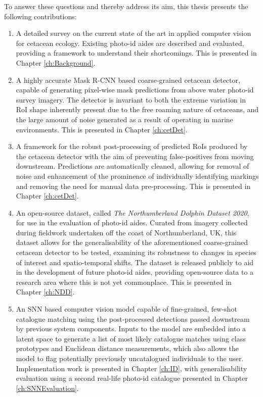 \noindent To answer these questions and thereby address its aim, this thesis presents the following contributions:

\begin{enumerate}
	\item A detailed survey on the current state of the art in applied computer vision for cetacean ecology. Existing photo-id aides are described and evaluated, providing a framework to understand their shortcomings. This is presented in Chapter \ref{ch:Background}. 
	\item A highly accurate Mask R-CNN \cite{he_mask_2017} based coarse-grained cetacean detector, capable of generating pixel-wise mask predictions from above water photo-id survey imagery. The detector is invariant to both the extreme variation in RoI shape inherently present due to the free roaming nature of cetaceans, and the large amount of noise generated as a result of operating in marine environments.  This is presented in Chapter \ref{ch:cetDet}.
	\item A framework for the robust post-processing of predicted RoIs produced by the cetacean detector with the aim of preventing false-positives from moving downstream. Predictions are automatically cleaned, allowing for removal of noise and enhancement of the prominence of individually identifying markings and removing the need for manual data pre-processing. This is presented in Chapter \ref{ch:cetDet}.
	\item An open-source dataset, called \textit{The Northumberland Dolphin Dataset 2020}, for use in the evaluation of photo-id aides. Curated from imagery collected during fieldwork undertaken off the coast of Northumberland, UK, this dataset allows for the generalisability of the aforementioned coarse-grained cetacean detector to be tested, examining its robustness to changes in species of interest and spatio-temporal shifts. The dataset is released publicly to aid in the development of future photo-id aides, providing open-source data to a research area where this is not yet commonplace. This is presented in Chapter \ref{ch:NDD}.
	\item An SNN based computer vision model capable of fine-grained, few-shot catalogue matching using the post-processed detections passed downstream by previous system components. Inputs to the model are embedded into a latent space to generate a list of most likely catalogue matches using class prototypes and Euclidean distance measurements, which also allows the model to flag potentially previously uncatalogued individuals to the user. Implementation work is presented in Chapter \ref{ch:ID}, with generalisability evaluation using a second real-life photo-id catalogue presented in Chapter \ref{ch:SNNEvaluation}.
\end{enumerate}

